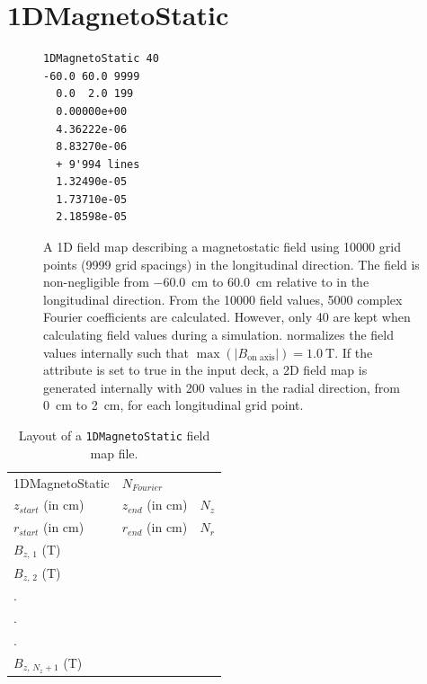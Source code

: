 \section{1DMagnetoStatic}
\label{sec:1DMagnetoStatic}
\begin{figure}[h]
  \begin{fmpage}
\begin{verbatim}
1DMagnetoStatic 40
-60.0 60.0 9999
  0.0  2.0 199
  0.00000e+00
  4.36222e-06
  8.83270e-06
  + 9'994 lines
  1.32490e-05
  1.73710e-05
  2.18598e-05
\end{verbatim}
  \end{fmpage}
  \caption[Example of a 1DMagnetoStatic field map]{A 1D field map describing a magnetostatic field using 10000 grid points
    (9999 grid spacings) in the longitudinal direction. The field is non-negligible from \SI{-60.0}{\centi\meter} to \SI{+60.0}{\centi\meter}
    relative to  in the longitudinal direction. From the 10000 field values, 5000 complex Fourier coefficients are
    calculated. However, only 40 are kept when calculating field values during a simulation. \opalt normalizes the field values
    internally such that $\max(|B_{\text{on axis}}|) = \SI{1.0}{\tesla}$. If the  attribute is set to true in the input
    deck, a 2D field map is generated internally with 200 values in the radial direction, from \SI{0}{\centi\meter} to \SI{2}{\centi\meter}, for each
    longitudinal grid point.}
  \label{fig:1DMagnetoStatic}
\end{figure}
\begin{table}[ht!]
    \caption{Layout of a \texttt{1DMagnetoStatic} field map file.}
    \label{tab:1DMagnetoStatic}
    \begin{center}
    \begin{tabular}{lll}
      \hline
      1DMagnetoStatic & $N_{Fourier}$ & \\
      $z_{start}$ (in cm) & $z_{end}$ (in cm) & $N_{z}$ \\
      $r_{start}$ (in cm) & $r_{end}$ (in cm) & $N_{r}$ \\
      $B_{z,\,1}$ (T) & & \\
      $B_{z,\,2}$ (T) & & \\
      . & & \\
      . & & \\
      . & & \\
      $B_{z,\,N_{z} + 1}$ (T) & & \\
      \hline
    \end{tabular}
    \end{center}
\end{table}


